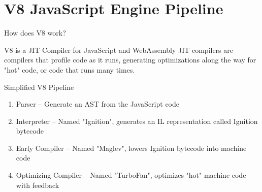 \section{V8 JavaScript Engine Pipeline}
\frame{\sectionpage}

\begin{frame}{How does V8 work?}
    \begin{block}{V8 is a JIT Compiler for JavaScript and WebAssembly}
    JIT compilers are compilers that profile code as it runs, generating optimizations along the way for "hot" code, or code that runs many times. 
    \end{block}
    \begin{block}{Simplified V8 Pipeline}
        \begin{enumerate}
            \item Parser -- Generate an AST from the JavaScript code
            \item Interpreter -- Named "Ignition", generates an IL representation called Ignition bytecode
            \item Early Compiler -- Named "Maglev", lowers Ignition bytecode into machine code
            \item Optimizing Compiler -- Named "TurboFan", optimizes "hot" machine code with feedback
        \end{enumerate}
    \end{block}
\end{frame} 

